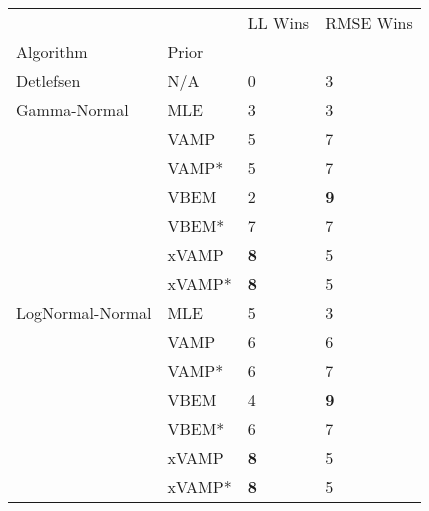 \begin{tabular}{llll}
\toprule
                 &        &     LL Wins &   RMSE Wins \\
Algorithm & Prior &             &             \\
\midrule
Detlefsen & N/A &           0 &           3 \\
Gamma-Normal & MLE &           3 &           3 \\
                 & VAMP &           5 &           7 \\
                 & VAMP* &           5 &           7 \\
                 & VBEM &           2 &  \textbf{9} \\
                 & VBEM* &           7 &           7 \\
                 & xVAMP &  \textbf{8} &           5 \\
                 & xVAMP* &  \textbf{8} &           5 \\
LogNormal-Normal & MLE &           5 &           3 \\
                 & VAMP &           6 &           6 \\
                 & VAMP* &           6 &           7 \\
                 & VBEM &           4 &  \textbf{9} \\
                 & VBEM* &           6 &           7 \\
                 & xVAMP &  \textbf{8} &           5 \\
                 & xVAMP* &  \textbf{8} &           5 \\
\bottomrule
\end{tabular}

